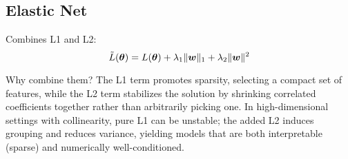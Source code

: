 
\subsection{Elastic Net}

Combines L1 and L2:
\begin{equation}
\tilde{L}(\boldsymbol{\theta}) = L(\boldsymbol{\theta}) + \lambda_1 \|\boldsymbol{w}\|_1 + \lambda_2 \|\boldsymbol{w}\|^2
\end{equation}

Why combine them? The L1 term promotes sparsity, selecting a compact set of features, while the L2 term stabilizes the solution by shrinking correlated coefficients together rather than arbitrarily picking one. In high-dimensional settings with collinearity, pure L1 can be unstable; the added L2 induces grouping and reduces variance, yielding models that are both interpretable (sparse) and numerically well-conditioned.


